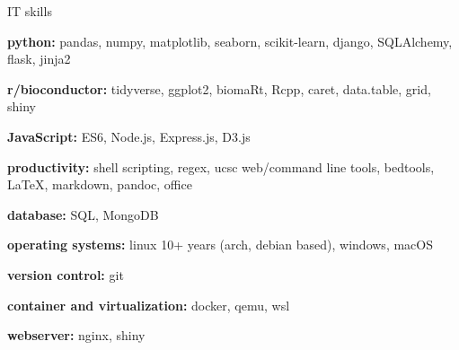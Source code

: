 

\begin{cvskills}
  \cvskill
    {IT skills} %
    {
      \begin{cvitems}
        \item {\textbf{python:} pandas, numpy, matplotlib, seaborn, scikit-learn, django, SQLAlchemy, flask, jinja2}
        \item {\textbf{r/bioconductor:} tidyverse, ggplot2, biomaRt, Rcpp, caret, data.table, grid, shiny}
        \item {\textbf{JavaScript:} ES6, Node.js, Express.js, D3.js}
        \item {\textbf{productivity:} shell scripting, regex, ucsc web/command line tools, bedtools, LaTeX, \newline markdown, pandoc, office}
        \item {\textbf{database:} SQL, MongoDB}
        \item {\textbf{operating systems:} linux 10+ years (arch, debian based), windows, macOS}
        \item {\textbf{version control:} git}
        \item {\textbf{container and virtualization:} docker, qemu, wsl}
        \item {\textbf{webserver:} nginx, shiny}
      \end{cvitems}
      }
      

\end{cvskills}
